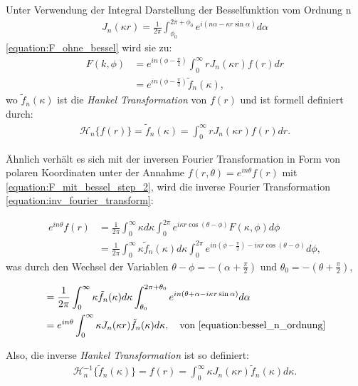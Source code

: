 Unter Verwendung der Integral Darstellung der Besselfunktion vom Ordnung n 
\begin{align}
	J_n(\kappa r)=\frac{1}{2\pi}\int_{\phi_{0}}^{2\pi + \phi_{0}}e^{i(n\alpha-\kappa r \sin \alpha)} d\alpha
	\label{equation:bessel_n_ordnung}
\end{align}
\eqref{equation:F_ohne_bessel} wird sie zu:
\begin{align}
	F(k,\phi)&=e^{in(\phi-\frac{\pi}{2})}\int_{0}^{\infty}rJ_n(\kappa r) f(r) dr \label{equation:F_mit_bessel_step_1} \\
	&=e^{in(\phi-\frac{\pi}{2})}\tilde{f}_n(\kappa),
	\label{equation:F_mit_bessel_step_2}
\end{align}
wo $\tilde{f}_n(\kappa)$ ist die \textit{Hankel Transformation} von $f(r)$ und ist formell definiert durch:
\begin{align}
	\mathscr{H}_n\{f(r)\}=\tilde{f}_n(\kappa)=\int_{0}^{\infty}rJ_n(\kappa r) f(r) dr.
	\label{equation:hankel}
\end{align}

Ähnlich verhält es sich mit der inversen Fourier Transformation in Form von polaren Koordinaten unter der Annahme $f(r,\theta)=e^{in\theta}f(r)$ mit \eqref{equation:F_mit_bessel_step_2}, wird die inverse Fourier Transformation \eqref{equation:inv_fourier_transform}:

\begin{align}
	e^{in\theta}f(r)&=\frac{1}{2\pi}\int_{0}^{\infty}\kappa d\kappa \int_{0}^{2\pi}e^{i\kappa r \cos (\theta - \phi)}F(\kappa,\phi) d\phi\\
	&= \frac{1}{2\pi}\int_{0}^{\infty}\kappa \tilde{f}_n(\kappa) d\kappa \int_{0}^{2\pi}e^{in(\phi - \frac{\pi}{2})- i\kappa r \cos (\theta - \phi)} d\phi,
\end{align}
was durch den Wechsel der Variablen $\theta-\phi=-(\alpha+\frac{\pi}{2})$ und $\theta_0=-(\theta+\frac{\pi}{2})$,

\begin{align}
	&= \frac{1}{2\pi}\int_{0}^{\infty}\kappa \tilde{f}_n(\kappa) d\kappa \int_{\theta_0}^{2\pi+\theta_0}e^{in(\theta + \alpha - i\kappa r \sin\alpha)} d\alpha \nonumber \\
	&= e^{in\theta}\int_{0}^{\infty}\kappa J_n(\kappa r) \tilde{f}_n(\kappa) d\kappa,\quad \text{von \eqref{equation:bessel_n_ordnung}}
\end{align}

Also, die inverse \textit{Hankel Transformation} ist so definiert:
\begin{align}
	\mathscr{H}^{-1}_n\{\tilde{f}_n(\kappa)\}=f(r)=\int_{0}^{\infty}\kappa J_n(\kappa r) \tilde{f}_n(\kappa) d\kappa.
	\label{equation:inv_hankel}
\end{align}

